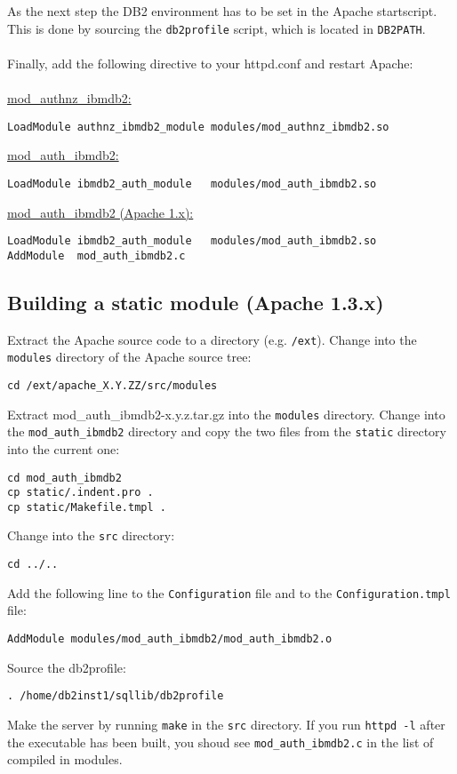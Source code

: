 \documentclass[11pt,letterpaper]{article}
\begin{document}
As the next step the DB2 environment has to be set in the Apache startscript. This is done by sourcing the {\tt db2profile} script, which is located in {\tt DB2PATH}.\\
\\
Finally, add the following directive to your httpd.conf and restart Apache:\\
\\
\underline{mod\_authnz\_ibmdb2:}
\begin{verbatim}
LoadModule authnz_ibmdb2_module modules/mod_authnz_ibmdb2.so
\end{verbatim}
\underline{mod\_auth\_ibmdb2:}
\begin{verbatim}
LoadModule ibmdb2_auth_module   modules/mod_auth_ibmdb2.so
\end{verbatim}
\underline{mod\_auth\_ibmdb2 (Apache 1.x):}
\begin{verbatim}
LoadModule ibmdb2_auth_module   modules/mod_auth_ibmdb2.so
AddModule  mod_auth_ibmdb2.c
\end{verbatim}

\subsection{Building a static module (Apache 1.3.x)}
Extract the Apache source code to a directory (e.g. {\tt /ext}). Change into the {\tt modules} directory of the Apache source tree:
\begin{verbatim}
cd /ext/apache_X.Y.ZZ/src/modules
\end{verbatim}
Extract mod\_auth\_ibmdb2-x.y.z.tar.gz into the {\tt modules} directory. Change into the {\tt mod\_auth\_ibmdb2} directory and copy the two files from the {\tt static} directory into the current one:
\begin{verbatim}
cd mod_auth_ibmdb2
cp static/.indent.pro .
cp static/Makefile.tmpl .
\end{verbatim}
Change into the {\tt src} directory:
\begin{verbatim}
cd ../..
\end{verbatim}
Add the following line to the {\tt Configuration} file and to the {\tt Configuration.tmpl} file:
\begin{verbatim}
AddModule modules/mod_auth_ibmdb2/mod_auth_ibmdb2.o
\end{verbatim}
Source the db2profile:
\begin{verbatim}
. /home/db2inst1/sqllib/db2profile
\end{verbatim}
Make the server by running {\tt make} in the {\tt src} directory. If you run {\tt httpd -l} after the executable has been built, you shoud see {\tt mod\_auth\_ibmdb2.c} in the list of compiled in modules.
\end{document}
